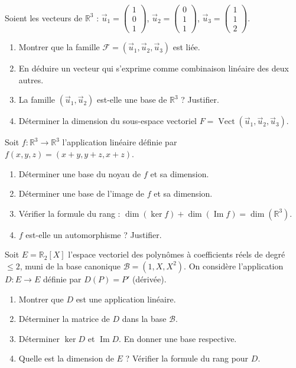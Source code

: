 \documentclass[11pt]{article}
\begin{document}
\begin{exercice}
Soient les vecteurs de $\mathbb{R}^3$ : $\vec{u}_1 = \begin{pmatrix} 1 \\ 0 \\ 1 \end{pmatrix}$, $\vec{u}_2 = \begin{pmatrix} 0 \\ 1 \\ 1 \end{pmatrix}$, $\vec{u}_3 = \begin{pmatrix} 1 \\ 1 \\ 2 \end{pmatrix}$.
\begin{enumerate}
    \item Montrer que la famille $\mathcal{F} = (\vec{u}_1, \vec{u}_2, \vec{u}_3)$ est liée.
    \item En déduire un vecteur qui s'exprime comme combinaison linéaire des deux autres.
    \item La famille $(\vec{u}_1, \vec{u}_2)$ est-elle une base de $\mathbb{R}^3$ ? Justifier.
    \item Déterminer la dimension du sous-espace vectoriel $F = \operatorname{Vect}(\vec{u}_1, \vec{u}_2, \vec{u}_3)$.
\end{enumerate}
\end{exercice}

\begin{exercice}
Soit $f : \mathbb{R}^3 \to \mathbb{R}^3$ l'application linéaire définie par $f(x,y,z) = (x+y, y+z, x+z)$.
\begin{enumerate}
    \item Déterminer une base du noyau de $f$ et sa dimension.
    \item Déterminer une base de l'image de $f$ et sa dimension.
    \item Vérifier la formule du rang : $\dim(\ker f) + \dim(\operatorname{Im} f) = \dim(\mathbb{R}^3)$.
    \item $f$ est-elle un automorphisme ? Justifier.
\end{enumerate}
\end{exercice}

\begin{exercice}
Soit $E = \mathbb{R}_2[X]$ l'espace vectoriel des polynômes à coefficients réels de degré $\leq 2$, muni de la base canonique $\mathcal{B} = (1, X, X^2)$.
On considère l'application $D : E \to E$ définie par $D(P) = P'$ (dérivée).
\begin{enumerate}
    \item Montrer que $D$ est une application linéaire.
    \item Déterminer la matrice de $D$ dans la base $\mathcal{B}$.
    \item Déterminer $\ker D$ et $\operatorname{Im} D$. En donner une base respective.
    \item Quelle est la dimension de $E$ ? Vérifier la formule du rang pour $D$.
\end{enumerate}
\end{exercice}
\end{document}
